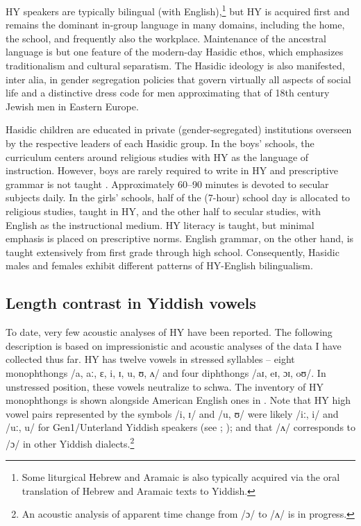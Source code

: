 \documentclass[output=paper]{langsci/langscibook}
\begin{document}
HY speakers are typically bilingual (with English),\footnote{Some liturgical Hebrew and Aramaic is also typically acquired via the oral translation of Hebrew and Aramaic texts to Yiddish.} but HY is acquired first and remains the dominant in-group language in many domains, including the home, the school, and frequently also the workplace. Maintenance of the ancestral language is but one feature of the modern-day Hasidic ethos, which emphasizes traditionalism and cultural separatism. The Hasidic ideology is also manifested, inter alia, in gender segregation policies that govern virtually all aspects of social life and a distinctive dress code for men approximating that of 18th century Jewish men in Eastern Europe.
 
 
Hasidic children are educated in private (gender-segregated) institutions overseen by the respective leaders of each Hasidic group. In the boys’ schools, the curriculum centers around religious studies with HY as the language of instruction. However, boys are rarely required to write in HY and prescriptive grammar is not taught \citep{Bleaman2018}. Approximately 60--90 minutes is devoted to secular subjects daily. In the girls’ schools, half of the (7-hour) school day is allocated to religious studies, taught in HY, and the other half to secular studies, with English as the instructional medium. HY literacy is taught, but minimal emphasis is placed on prescriptive norms. English grammar, on the other hand, is taught extensively from first grade through high school. Consequently, Hasidic males and females exhibit different patterns of HY-English bilingualism. 
 

\subsection{Length contrast in Yiddish vowels}
\label{sec:nove:2.3}

To date, very few acoustic analyses of HY have been reported. The following description is based on impressionistic and acoustic analyses of the data I have collected thus far. HY has twelve vowels in stressed syllables -- eight monophthongs /a, aː, ɛ, i, ɪ, u, ʊ, ʌ/ and four diphthongs /aɪ, eɪ, ɔɪ, oʊ/. In unstressed position, these vowels neutralize to schwa. The inventory of HY monophthongs is shown alongside American English ones in . Note that HY high vowel pairs represented by the symbols /i, ɪ/ and /u, ʊ/ were likely /iː, i/ and /uː, u/ for Gen1/Unterland Yiddish speakers (see \citealt{Nove2020}; \citealt{Weinreich1964}); and that /ʌ/ corresponds to /ɔ/ in other Yiddish dialects.\footnote{An acoustic analysis of apparent time change from /ɔ/ to /ʌ/ is in progress.} 
\end{document}
